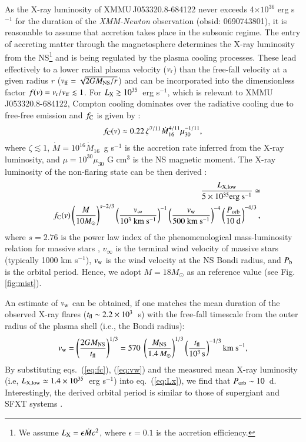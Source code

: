 \documentclass[a4paper,fleqn,usenatbib]{mnras}
\newcommand{\ergs}[1]{$\times 10^{#1}$ erg s$^{-1}$}
\newcommand{\xmm}{{\it XMM-Newton}\xspace}
\newcommand{\candb}{XMMU\,J053320.8-684122\xspace} %
\newcommand{\eqb}{\begin{eqnarray}}
\newcommand{\eqe}{\end{eqnarray}}
\begin{document}
As the X-ray luminosity of \candb never exceeds 4\ergs{36} for the duration of the \xmm observation (obsid: 0690743801), it is reasonable to assume that accretion takes place in the subsonic regime.
The entry of accreting matter through the magnetosphere determines the X-ray luminosity from the NS\footnote{We assume  $L_{\rm X}=\epsilon \dot{M}c^2$, where $\epsilon=0.1$ is the accretion efficiency.} and is being regulated by the plasma cooling processes. These lead effectively to a lower radial plasma velocity ($v_{\rm r}$) than the free-fall velocity at a given radius $r$ ($v_{\rm ff}=\sqrt{2GM_{\rm NS}/r}$) and can be incorporated into the dimensionless factor $f(v)=v_{\rm r}/v_{\rm ff} \lesssim 1$. For $L_{\rm X} \gtrsim 10^{35}$~erg s$^{-1}$, which is relevant to \candb,  Compton cooling dominates over the radiative cooling due to free-free emission and $f_{\rm C}$ is given by \citep{2017arXiv170203393S}:
\eqb 
f_{\rm C}(v) \approx 0.22 \, \zeta^{7/11}\dot{M}_{16}^{4/11}\mu_{30}^{-1/11},
\label{eq:fc}
\eqe 
where $\zeta\lesssim 1$, $\dot{M}=10^{16} \dot{M}_{16}$~g s$^{-1}$ is the accretion rate inferred from the X-ray luminosity, and $\mu=10^{30}\mu_{30}$ G cm$^3$ is the NS magnetic moment. The X-ray luminosity of the non-flaring state can be then derived \citep{2014MNRAS.442.2325S}:
\eqb 
& &\frac{L_{\rm X, low}}{5\times 10^{35} {\rm erg \ s}^{-1}} \simeq  \\ \nonumber 
& & f_{\rm C}(v) \left(\frac{M}{10 M_{\odot}}\right)^{s-2/3} \left(\frac{v_{\infty}}{10^{3} \ {\rm km \ s^{-1}} }\right)^{-1}\left(\frac{v_{\rm w}}{500 \ {\rm km \ s^{-1}}}\right)^{-4}\left(\frac{P_{\rm orb}}{10 \ {\rm d}} \right)^{-4/3},
\label{eq:Lx}
\eqe 
where $s=2.76$ is the power law index of the phenomenological mass-luminosity relation for massive stars \citep[see][]{2007AstL...33..251V}, $v_{\infty}$ is the terminal wind velocity of massive stars (typically 1000 km s$^{-1}$), $v_{\rm w}$ is the wind velocity at the NS Bondi radius, and $P_{\rm b}$ is the orbital period. Hence, we adopt $M=18 M_{\odot}$ as an reference value (see Fig. \ref{fig:mist}). 

An estimate of $v_{\rm w}$ can be obtained, if one matches the mean duration of the observed X-ray flares ($t_{\rm fl} \sim 2.2\times 10^3$~s) with the free-fall timescale from the outer radius of the plasma shell (i.e., the Bondi radius):
\eqb 
v_{\rm w} = \left(\frac{2GM_{\rm NS}}{t_{\rm fl}}\right)^{1/3} =  570\ \left(\frac{M_{\rm NS}}{1.4 \,  M_{\odot}}\right)^{1/3}\left(\frac{t_{\rm fl}}{10^3\, {\rm s}}\right)^{-1/3} {\rm km \ s}^{-1},
\label{eq:vw}
\eqe 
By substituting  eqs.~(\ref{eq:fc}), (\ref{eq:vw}) and the measured mean X-ray luminosity (i.e, $L_{\rm X, low} \simeq 1.4\times 10^{35}$~erg s$^{-1}$) into eq.~(\ref{eq:Lx}), we find that  $P_{\rm orb}\sim 10$~d. Interestingly, the derived orbital period is similar to those of supergiant and SFXT systems \citep[e.g.][]{2012A&A...539A..21D}.   
\end{document}
